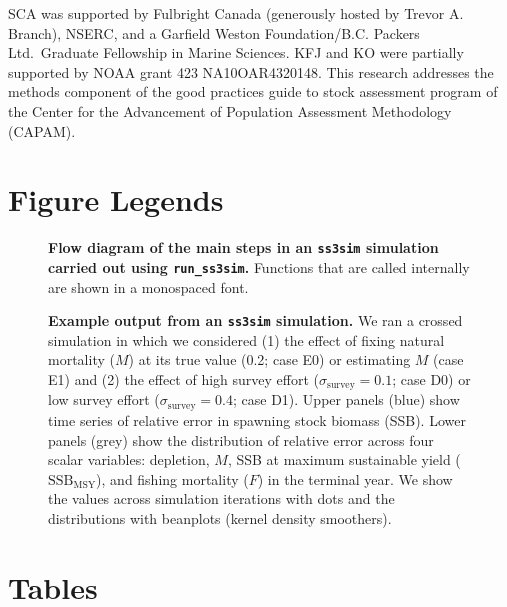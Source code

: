 \documentclass[11pt]{article}
\begin{document}
SCA was supported by Fulbright Canada (generously hosted by Trevor A. Branch), NSERC, and a Garfield Weston Foundation/B.C. Packers Ltd.~Graduate Fellowship in Marine Sciences. KFJ and KO were partially supported by NOAA grant 423 NA10OAR4320148. This research addresses the methods component of the good practices guide to stock assessment program of the Center for the Advancement of Population Assessment Methodology (CAPAM).



\clearpage

\section*{Figure Legends}

\begin{figure}[!ht]
\begin{center}
\end{center}
\caption{
{\bf Flow diagram of the main steps
in an \texttt{ss3sim} simulation carried out using \texttt{run\_ss3sim}.}
Functions that are called internally are shown in a monospaced font.
}
\label{fig:sim-steps}
\end{figure}

\begin{figure}[!ht]
\begin{center}
\end{center}
\caption{
{\bf Example output from an \texttt{ss3sim} simulation.}
We ran a crossed simulation in which we considered
(1) the effect of fixing natural mortality ($M$)
at its true value (0.2; case E0) or estimating $M$ (case E1) and
(2) the effect of high survey effort
($\sigma_\mathrm{survey} = 0.1$; case D0)
or low survey effort ($\sigma_\mathrm{survey} = 0.4$; case D1).
Upper panels (blue) show time series of relative error
in spawning stock biomass (SSB).
Lower panels (grey) show the distribution
of relative error across four scalar variables:
depletion, $M$, SSB at maximum sustainable yield ($\mathrm{SSB}_\mathrm{MSY}$),
and fishing mortality ($F$) in the terminal year.
We show the values across simulation iterations with dots
and the distributions with beanplots (kernel density smoothers).
}
\label{fig:results}
\end{figure}

\clearpage

\section*{Tables}
\end{document}
